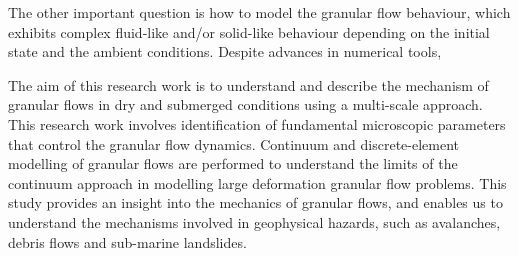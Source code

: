 The other important question is how to model the granular flow behaviour, which 
exhibits complex fluid-like and/or solid-like behaviour depending on the 
initial state and the ambient conditions. Despite advances in numerical tools, 

The aim of this research work is to 
understand and describe the mechanism of granular flows in dry and submerged 
conditions using a multi-scale approach. This research work involves 
identification of fundamental microscopic parameters that control the granular 
flow dynamics. Continuum and discrete-element modelling of granular flows are 
performed to understand the limits of the continuum approach in modelling 
large deformation granular flow problems. This study provides an insight 
into the mechanics of granular flows, and enables us to understand the 
mechanisms involved in geophysical hazards, such as avalanches, debris flows 
and sub-marine landslides.

